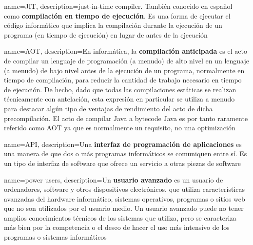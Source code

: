 

{
    name=JIT,
    description={just-in-time compiler. También conocido en español como \textbf{compilación en tiempo de ejecución}. Es una forma de ejecutar el código informático que implica la compilación durante la ejecución de un programa (en tiempo de ejecución) en lugar de antes de la ejecución}
}

{
    name=AOT,
    description={En informática, la \textbf{compilación anticipada} es el acto de compilar un lenguaje de programación (a menudo) de alto nivel en un lenguaje (a menudo) de bajo nivel antes de la ejecución de un programa, normalmente en tiempo de compilación, para reducir la cantidad de trabajo necesario en tiempo de ejecución.
    De hecho, dado que todas las compilaciones estáticas se realizan técnicamente con antelación, esta expresión en particular se utiliza a menudo para destacar algún tipo de ventajas de rendimiento del acto de dicha precompilación. El acto de compilar Java a bytecode Java es por tanto raramente referido como AOT ya que es normalmente un requisito, no una optimización}
}

{
    name=API,
    description={Una \textbf{interfaz de programación de aplicaciones} es una manera de que dos o más programas informáticos se comuniquen entre sí. Es un tipo de interfaz de software que ofrece un servicio a otras piezas de software}
}

{
    name=power users,
    description={Un \textbf{usuario avanzado} es un usuario de ordenadores, software y otros dispositivos electrónicos, que utiliza características avanzadas del hardware informático, sistemas operativos, programas o sitios web que no son utilizados por el usuario medio. Un usuario avanzado puede no tener amplios conocimientos técnicos de los sistemas que utiliza, pero se caracteriza más bien por la competencia o el deseo de hacer el uso más intensivo de los programas o sistemas informáticos}
}

